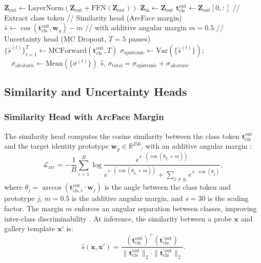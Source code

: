 \documentclass[10pt,journal,compsoc]{IEEEtran}
\begin{document}
\begin{algorithm}[t]
\begin{algorithmic}[1]
    \State $\mathbf{Z}_{\text{out}} \leftarrow \text{LayerNorm}(\mathbf{Z}_{\text{out}} + \text{FFN}(\mathbf{Z}_{\text{out}}))$
    \State $\mathbf{Z}_{\text{in}} \leftarrow \mathbf{Z}_{\text{out}}$
\EndFor
\State $\mathbf{t}_{\text{cls}}^{\text{out}} \leftarrow \mathbf{Z}_{\text{out}}[0, :]$ // Extract class token
\State // Similarity head (ArcFace margin)
\State $\hat{s} \leftarrow \cos(\mathbf{t}_{\text{cls}}^{\text{out}}, \mathbf{w}_y) - m$ // with additive angular margin $m=0.5$
\State // Uncertainty head (MC Dropout, $T=5$ passes)
\State $\{\hat{s}^{(t)}\}_{t=1}^{T} \leftarrow \text{MCForward}(\mathbf{t}_{\text{cls}}^{\text{out}}, T)$
\State $\sigma_{\text{epistemic}} \leftarrow \text{Var}(\{\hat{s}^{(t)}\})$; $\quad \sigma_{\text{aleatoric}} \leftarrow \text{Mean}(\{\sigma^{(t)}\})$
\State \Return $\hat{s}$, $\sigma_{\text{total}} = \sigma_{\text{epistemic}} + \sigma_{\text{aleatoric}}$
\end{algorithmic}
\end{algorithm}

\subsection{Similarity and Uncertainty Heads}
\label{sec:uncertainty_heads}

\subsubsection{Similarity Head with ArcFace Margin}

The similarity head computes the cosine similarity between the class token $\mathbf{t}_{\text{cls}}^{\text{out}}$ and the target identity prototype $\mathbf{w}_y \in \mathbb{R}^{256}$, with an additive angular margin \cite{deng2019arcface}:
\begin{equation}
\label{eq:arcface}
\mathcal{L}_{\text{arc}} = -\frac{1}{B} \sum_{i=1}^{B} \log \frac{e^{s \cdot (\cos(\theta_{y_i} + m))}}{e^{s \cdot (\cos(\theta_{y_i} + m))} + \sum_{j \neq y_i} e^{s \cdot \cos(\theta_j)}},
\end{equation}
where $\theta_j = \arccos(\mathbf{t}_{\text{cls},i}^{\text{out}} \cdot \mathbf{w}_j)$ is the angle between the class token and prototype $j$, $m = 0.5$ is the additive angular margin, and $s = 30$ is the scaling factor. The margin $m$ enforces an angular separation between classes, improving inter-class discriminability \cite{deng2019arcface, kim2022adaface}. At inference, the similarity between a probe $\mathbf{x}$ and gallery template $\mathbf{x}'$ is:
\begin{equation}
\label{eq:similarity}
\hat{s}(\mathbf{x}, \mathbf{x}') = \frac{(\mathbf{t}_{\text{cls}}^{\text{out}})^{\top} (\mathbf{t}_{\text{cls}}^{\prime\text{out}})}{\|\mathbf{t}_{\text{cls}}^{\text{out}}\|_2 \cdot \|\mathbf{t}_{\text{cls}}^{\prime\text{out}}\|_2}.
\end{equation}
\end{document}
